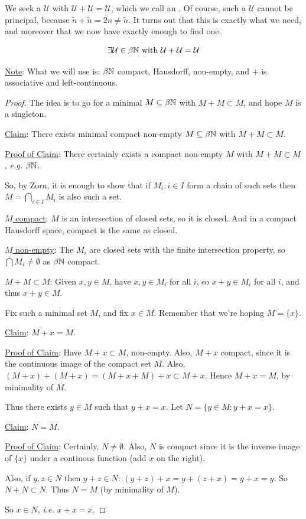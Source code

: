 \documentclass[10pt]{article}
\newcommand{\U}{\mathcal{U}}
\begin{document}
We seek a $\U$ with $\U + \U = \U$, which we call an . Of course, such a $\U$ cannot be principal, because $\tilde{n} + \tilde{n} = \widetilde{2n}\ne \tilde{n}$. It turns out that this is exactly what we need, and moreover that we now have exactly enough to find one.

\begin{lemma}
    $$\exists \U \in \beta\N\textrm{ with }\U + \U = \U$$
\end{lemma}

\underline{Note}: What we will use is: $\beta\mathbb{N}$ compact, Hausdorff, non-empty, and $+$ is associative and left-continuous.

\begin{proof}
    The idea is to go for a minimal $M\subseteq \beta\mathbb{N}$ with $M+M\subset M$, and hope $M$ is a singleton.

    \underline{Claim}: There exists minimal compact non-empty $M\subseteq \beta\mathbb{N}$ with $M+M\subset M$.

    \underline{Proof of Claim}: There certainly exists a compact non-empty $M$ with $M+M\subset M$, \it{e.g.} $\beta\mathbb{N}$.

    So, by Zorn, it is enough to show that if $M_i:i\in I$ form a chain of such sets then $M = \bigcap_{i\in I}M_i$ is also such a set.

    \underline{$M$ compact}: $M$ is an intersection of closed sets, so it is closed. And in a compact Hausdorff space, compact is the same as closed.

    \underline{$M$ non-empty}: The $M_i$ are closed sets with the finite intersection property, so $\bigcap M_i\ne\emptyset$ as $\beta\mathbb{N}$ compact.

    \underline{$M+M\subset M$}: Given $x,y\in M$, have $x,y\in M_i$ for all $i$, so $x+y \in M_i$ for all $i$, and thus $x + y \in M$. \qedsymbol

    Fix such a minimal set $M$, and fix $x \in M$. Remember that we're hoping $M = \{x\}$.

    \underline{Claim}: $M+x = M$.
    
    \underline{Proof of Claim}: Have $M+x \subset M$, non-empty. Also, $M+x$ compact, since it is the continuous image of the compact set $M$. Also, $(M+x) + (M+x) = (M+x+M)+x \subset M+x$. Hence $M+x = M$, by minimality of $M$. \qedsymbol

    Thus there exists $y \in M$ such that $y + x = x$. Let $N = \{y \in M: y + x = x\}$.

    \underline{Claim}: $N = M$.

    \underline{Proof of Claim}: Certainly, $N\ne \emptyset$. Also, $N$ is compact since it is the inverse image of $\{x\}$ under a continous function (add $x$ on the right).

    Also, if $y,z \in N$ then $y + z \in N$: $(y+z)+x = y+(z+x) = y + x = y$. So $N+N\subset N$. Thus $N = M$ (by minimality of $M$).

    So $x \in N$, \it{i.e.} $x + x = x$.
\end{proof}
\end{document}
